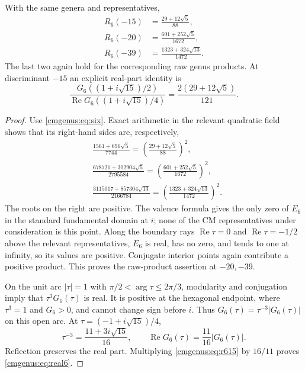 \begin{theorem}
\label{cmgenus:thm:six}
With the same genera and representatives,
\begin{align}
 R_6(-15)&=\frac{29+12\sqrt5}{88},
       \label{cmgenus:eq:r615}\\
 R_6(-20)&=\frac{601+252\sqrt5}{1672},
       \label{cmgenus:eq:r620}\\
 R_6(-39)&=\frac{1323+324\sqrt{13}}{1472}.
       \label{cmgenus:eq:r639}
\end{align}
The last two again hold for the corresponding raw genus products.
At discriminant $-15$ an explicit real-part identity is
\begin{equation}
 \frac{G_6((1+i\sqrt{15})/2)}
      {\operatorname{Re}G_6((1+i\sqrt{15})/4)}
 =\frac{2(29+12\sqrt5)}{121}.
 \label{cmgenus:eq:real6}
\end{equation}
\end{theorem}

\begin{proof}
Use \eqref{cmgenus:eq:six}. Exact arithmetic in the relevant quadratic
field shows that its right-hand sides are, respectively,
\begin{align*}
 &\frac{1561+696\sqrt5}{7744}
      =\left(\frac{29+12\sqrt5}{88}\right)^2,\\
 &\frac{678721+302904\sqrt5}{2795584}
      =\left(\frac{601+252\sqrt5}{1672}\right)^2,\\
 &\frac{3115017+857304\sqrt{13}}{2166784}
      =\left(\frac{1323+324\sqrt{13}}{1472}\right)^2.
\end{align*}
The roots on the right are positive. The valence formula gives the
only zero of $E_6$ in the standard fundamental domain at $i$; none of
the CM representatives under consideration is this point. Along the
boundary rays $\operatorname{Re}\tau=0$ and
$\operatorname{Re}\tau=-1/2$ above the relevant representatives,
$E_6$ is real, has no zero, and tends to one at infinity, so its values
are positive. Conjugate interior points again contribute a positive
product. This proves the raw-product assertion at $-20,-39$.

On the unit arc $|\tau|=1$ with
$\pi/2<\arg\tau\leq2\pi/3$, modularity and conjugation imply that
$\tau^3G_6(\tau)$ is real. It is positive at the hexagonal endpoint,
where $\tau^3=1$ and $G_6>0$, and cannot change sign before $i$.
Thus $G_6(\tau)=\tau^{-3}|G_6(\tau)|$ on this open arc. At
$\tau=(-1+i\sqrt{15})/4$,
\[
 \tau^{-3}=\frac{11+3i\sqrt{15}}{16},\qquad
 \operatorname{Re}G_6(\tau)=\frac{11}{16}|G_6(\tau)|.
\]
Reflection preserves the real part. Multiplying
\eqref{cmgenus:eq:r615} by $16/11$ proves
\eqref{cmgenus:eq:real6}.
\end{proof}

